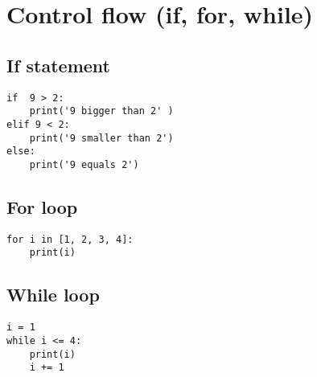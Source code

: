 \documentclass[12pt]{article}
\begin{document}
\section*{Control flow (if, for, while)}

\begin{minipage}[t]{0.40\textwidth}
\subsection*{If statement}
\begin{verbatim}
if  9 > 2:
    print('9 bigger than 2' )
elif 9 < 2:
    print('9 smaller than 2')
else:
    print('9 equals 2')
\end{verbatim}
\end{minipage}
\begin{minipage}[t]{0.30\textwidth}
\subsection*{For loop}
\begin{verbatim}
for i in [1, 2, 3, 4]:
    print(i)
\end{verbatim}
\end{minipage}
\begin{minipage}[t]{0.25\textwidth}
\subsection*{While loop}
\begin{verbatim}
i = 1
while i <= 4:
    print(i)
    i += 1
\end{verbatim}
\end{minipage}
\end{document}

